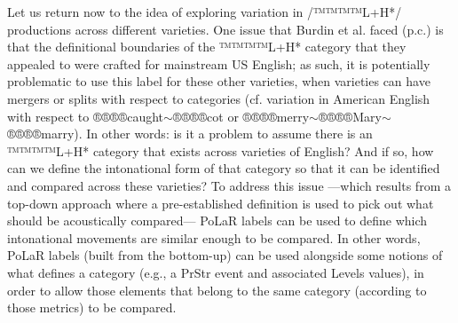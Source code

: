 \documentclass[11pt, twoside]{memoir}
\begin{document}
Let us return now to the idea of exploring variation in /™™™™{L+H*}/ productions across different varieties. One issue that Burdin et al. faced (p.c.) is that the definitional boundaries of the ™™™™{L+H*} category that they appealed to were crafted for mainstream US English; as such, it is potentially problematic to use this label for these other varieties, when varieties can have mergers or splits with respect to categories (cf. variation in American English with respect to ®®®®{caught}$\sim$®®®®{cot} or ®®®®{merry}$\sim$®®®®{Mary}$\sim$®®®®{marry}). In other words: is it a problem to assume there is an ™™™™{L+H*} category that exists across varieties of English? And if so, how can we define the intonational form of that category so that it can be identified and compared across these varieties? To address this issue —which results from a top-down approach where a pre-established definition is used to pick out what should be acoustically compared— PoLaR labels can be used to define which intonational movements are similar enough to be compared. In other words, PoLaR labels (built from the bottom-up) can be used alongside some notions of what defines a category (e.g., a PrStr event and associated Levels values), in order to allow those elements that belong to the same category (according to those metrics) to be compared.
\end{document}
